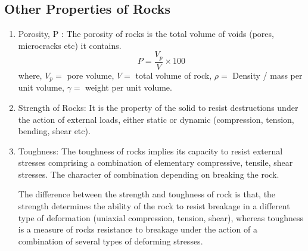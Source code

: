 \documentclass{article}
\begin{document}
\begin{multicols}{2}
  \subsection*{Other Properties of Rocks}
  \begin{enumerate}
    \item Porosity, P : The porosity of rocks is the total volume of voids (pores, microcracks etc) it contains. 
    $$P = \frac{V_p}{V} \times 100$$
    where, $V_p = $ pore volume, $V = $ total volume of rock, $\rho = $ Density / mass per unit volume, $\gamma = $ weight per unit volume. 
    \item Strength of Rocks: It is the property of the solid to resist destructions under the action of external loads, either static or dynamic (compression, tension, bending, shear etc).
    \item Toughness: The toughness of rocks implies its capacity to resist external stresses comprising a combination of elementary compressive, tensile, shear stresses. The character of combination depending on breaking the rock. 
    
    The difference between the strength and toughness of rock is that, the strength determines the ability of the rock to resist breakage in a different type of deformation (uniaxial compression, tension, shear), whereas toughness is a measure of rocks resistance to breakage under the action of a combination of several types of deforming stresses.
  \end{enumerate}

  

\end{multicols}
  
\end{document}
